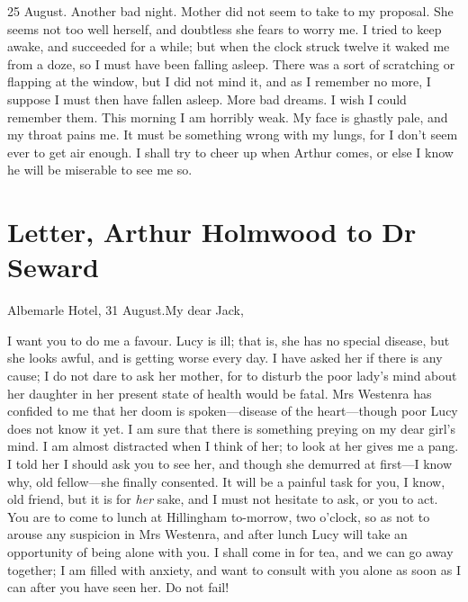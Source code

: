  
\begin{diary}{25 August.}
Another bad night. Mother did not seem to take to my proposal. She seems not too well herself, and doubtless she fears to worry me. I tried to keep awake, and succeeded for a while; but when the clock struck twelve it waked me from a doze, so I must have been falling asleep. There was a sort of scratching or flapping at the window, but I did not mind it, and as I remember no more, I suppose I must then have fallen asleep. More bad dreams. I wish I could remember them. This morning I am horribly weak. My face is ghastly pale, and my throat pains me. It must be something wrong with my lungs, for I don't seem ever to get air enough. I shall try to cheer up when Arthur comes, or else I know he will be miserable to see me so.
\end{diary}

\begin{a4}
	\clearpage
\end{a4}

\section{Letter, Arthur Holmwood to Dr Seward}

\begin{mail}{Albemarle Hotel, 31 August.}{My dear Jack,}

I want you to do me a favour. Lucy is ill; that is, she has no special disease, but she looks awful, and is getting worse every day. I have asked her if there is any cause; I do not dare to ask her mother, for to disturb the poor lady's mind about her daughter in her present state of health would be fatal. Mrs Westenra has confided to me that her doom is spoken—disease of the heart—though poor Lucy does not know it yet. I am sure that there is something preying on my dear girl's mind. I am almost distracted when I think of her; to look at her gives me a pang. I told her I should ask you to see her, and though she demurred at first—I know why, old fellow—she finally consented. It will be a painful task for you, I know, old friend, but it is for \textit{her} sake, and I must not hesitate to ask, or you to act. You are to come to lunch at Hillingham to-morrow, two o'clock, so as not to arouse any suspicion in Mrs Westenra, and after lunch Lucy will take an opportunity of being alone with you. I shall come in for tea, and we can go away together; I am filled with anxiety, and want to consult with you alone as soon as I can after you have seen her. Do not fail!

\end{mail}


